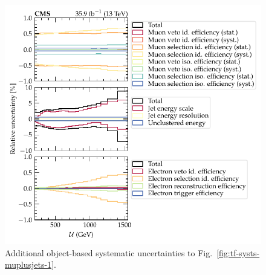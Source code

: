 %
\begin{figure}
    \centering
    \includegraphics{chapters/042_backgrounds/images/tf_wj_mu_met_systs2.pdf}
    \caption[Object-based uncertainties on the transfer factors]{
        Additional object-based systematic uncertainties to Fig.~\ref{fig:tf-systs-muplusjets-1}.
    }
    \label{fig:tf-systs-muplusjets-2}
\end{figure}
%
